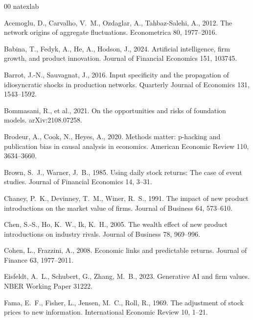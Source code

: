 \documentclass[review,12pt,authoryear]{elsarticle}
\begin{document}
\begin{thebibliography}{00}
\expandafter\ifx\csname natexlab\endcsname\relax\def\natexlab#1{#1}\fi

Acemoglu, D., Carvalho, V.~M., Ozdaglar, A., Tahbaz-Salehi, A., 2012.
The network origins of aggregate fluctuations. Econometrica 80, 1977--2016.

Babina, T., Fedyk, A., He, A., Hodson, J., 2024. Artificial intelligence,
firm growth, and product innovation. Journal of Financial Economics 151,
103745.

Barrot, J.-N., Sauvagnat, J., 2016. Input specificity and the propagation of
idiosyncratic shocks in production networks. Quarterly Journal of Economics
131, 1543--1592.

Bommasani, R., et al., 2021. On the opportunities and risks of foundation
models. arXiv:2108.07258.

Brodeur, A., Cook, N., Heyes, A., 2020. Methods matter: p-hacking and
publication bias in causal analysis in economics. American Economic Review
110, 3634--3660.

Brown, S.~J., Warner, J.~B., 1985. Using daily stock returns: The case of
event studies. Journal of Financial Economics 14, 3--31.

Chaney, P.~K., Devinney, T.~M., Winer, R.~S., 1991. The impact of new product
introductions on the market value of firms. Journal of Business 64, 573--610.

Chen, S.-S., Ho, K.~W., Ik, K.~H., 2005. The wealth effect of new product
introductions on industry rivals. Journal of Business 78, 969--996.

Cohen, L., Frazzini, A., 2008. Economic links and predictable returns.
Journal of Finance 63, 1977--2011.

Eisfeldt, A.~L., Schubert, G., Zhang, M.~B., 2023. Generative AI and firm
values. NBER Working Paper 31222.

Fama, E.~F., Fisher, L., Jensen, M.~C., Roll, R., 1969. The adjustment of
stock prices to new information. International Economic Review 10, 1--21.


\end{thebibliography}
\end{document}

